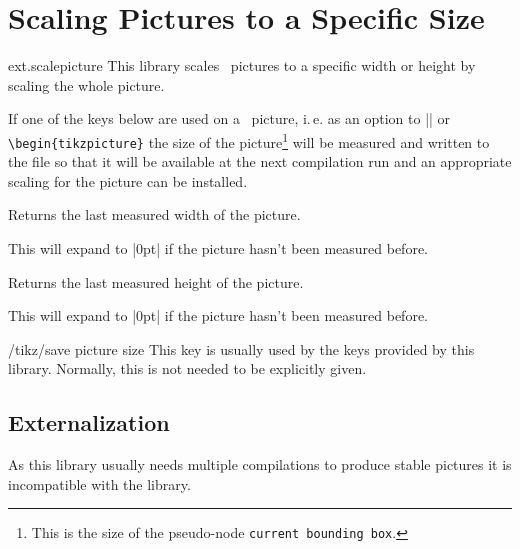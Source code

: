 %
%
%
\clearpage
\section{Scaling Pictures to a Specific Size}
\label{library:scalepicture}

\begin{tikzlibrary}{ext.scalepicture}
  This library scales \tikzname\ pictures to a specific width or height
  by scaling the whole picture.
\end{tikzlibrary}

\begin{multicols}{2}
If one of the keys below are used on a \tikzname\ picture, i.\,e.
as an option to |\tikzpicture| or \texttt{\textbackslash begin\{tikzpicture\}}
the size of the picture\footnote{This is the size of the pseudo-node \texttt{current bounding box}.}
will be measured and written to the  file
so that it will be available at the next compilation run
and an appropriate scaling for the picture can be installed.

\begin{command}{\tikzextpicturewidth}
  Returns the last measured width of the picture.
  
  This will expand to |0pt| if the picture hasn't been measured before.
\end{command}
\begin{command}{\tikzextpictureheight}
  Returns the last measured height of the picture.
  
  This will expand to |0pt| if the picture hasn't been measured before.
\end{command}

\begin{stylekey}{/tikz/save picture size}
  This key is usually used by the keys provided by this library.
  Normally, this is not needed to be explicitly given.
\end{stylekey}

\subsection{Externalization}
As this library usually needs multiple compilations
to produce stable pictures it is incompatible
with the  library.


\end{multicols}
